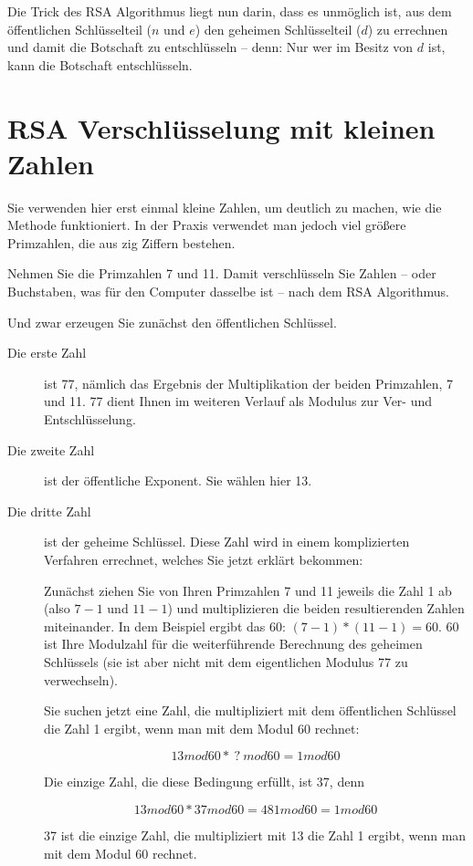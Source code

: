 \documentclass[a4paper,11pt, oneside,openright,titlepage,dvips]{scrbook}
\newcommand{\bmod}{mod}
\newcounter{chapter}
\newcounter{section}[chapter]
\begin{document}
Die Trick des RSA Algorithmus liegt nun darin, dass es unmöglich ist,
aus dem öffentlichen Schlüsselteil ($n$ und $e$) den geheimen
Schlüsselteil ($d$) zu errechnen und damit die Botschaft zu
entschlüsseln -- denn: Nur wer im Besitz von $d$ ist, kann die
Botschaft entschlüsseln.


\clearpage 
\section{RSA Verschlüsselung mit kleinen Zahlen}

Sie verwenden hier erst einmal kleine Zahlen, um deutlich
zu machen, wie die Methode funktioniert. In der Praxis verwendet
man jedoch viel größere Primzahlen, die aus ­zig Ziffern bestehen.

Nehmen Sie die Primzahlen 7 und 11. Damit verschlüsseln Sie
Zahlen ­-- oder Buchstaben, was für den Computer dasselbe ist --
nach dem RSA Algorithmus.

Und zwar erzeugen Sie zunächst den öffentlichen Schlüssel.

\begin{description}
\item [Die erste Zahl] ist 77, nämlich das Ergebnis der Multiplikation
  der beiden Primzahlen, 7 und 11. 77 dient Ihnen im weiteren Verlauf
  als Modulus zur Ver- und Entschlüsselung.

\item [Die zweite Zahl] ist der öffentliche Exponent. Sie wählen hier 13.

\item [Die dritte Zahl] ist der geheime Schlüssel. Diese Zahl wird in einem
  komplizierten Verfahren errechnet, welches Sie jetzt erklärt
  bekommen:

Zunächst ziehen Sie von Ihren Primzahlen 7 und 11 jeweils die Zahl 1
ab (also $7 - 1$ und $11 - 1$) und multiplizieren die beiden
resultierenden Zahlen miteinander. In dem Beispiel ergibt das 60:
$( 7 - 1 ) * ( 11 - 1) = 60$. 60 ist Ihre Modulzahl für die
weiterführende Berechnung des geheimen Schlüssels (sie ist aber nicht
mit dem eigentlichen Modulus 77 zu verwechseln).

Sie suchen jetzt eine Zahl, die multipliziert mit dem öffentlichen
Schlüssel die Zahl 1 ergibt, wenn man mit dem Modul 60 rechnet:

\[ 13 \bmod 60 *~?~\bmod 60 = 1 \bmod 60 \]

Die einzige Zahl, die diese Bedingung erfüllt, ist 37, denn

\[ 13 \bmod 60 * 37 \bmod 60 = 481 \bmod 60 = 1 \bmod 60 \]

37 ist die einzige Zahl, die multipliziert mit 13 die Zahl 1 ergibt,
wenn man mit dem Modul 60 rechnet.

\end{description}
\end{document}

